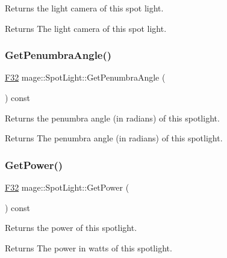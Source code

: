 Returns the light camera of this spot light.

\begin{DoxyReturn}{Returns}
The light camera of this spot light. 
\end{DoxyReturn}
\hypertarget{classmage_1_1_spot_light_a37d61501193f5ed4ecefe4015595ed89}{}\label{classmage_1_1_spot_light_a37d61501193f5ed4ecefe4015595ed89} 
\subsubsection{\texorpdfstring{Get\+Penumbra\+Angle()}{GetPenumbraAngle()}}
{\footnotesize\ttfamily \hyperlink{namespacemage_aa97e833b45f06d60a0a9c4fc22ae02c0}{F32} mage\+::\+Spot\+Light\+::\+Get\+Penumbra\+Angle (\begin{DoxyParamCaption}{ }\end{DoxyParamCaption}) const\hspace{0.3cm}{\ttfamily [noexcept]}}

Returns the penumbra angle (in radians) of this spotlight.

\begin{DoxyReturn}{Returns}
The penumbra angle (in radians) of this spotlight. 
\end{DoxyReturn}
\hypertarget{classmage_1_1_spot_light_afcfb600550f5ca9292e79e5bedb9fad7}{}\label{classmage_1_1_spot_light_afcfb600550f5ca9292e79e5bedb9fad7} 
\subsubsection{\texorpdfstring{Get\+Power()}{GetPower()}}
{\footnotesize\ttfamily \hyperlink{namespacemage_aa97e833b45f06d60a0a9c4fc22ae02c0}{F32} mage\+::\+Spot\+Light\+::\+Get\+Power (\begin{DoxyParamCaption}{ }\end{DoxyParamCaption}) const\hspace{0.3cm}{\ttfamily [noexcept]}}

Returns the power of this spotlight.

\begin{DoxyReturn}{Returns}
The power in watts of this spotlight. 
\end{DoxyReturn}
\hypertarget{classmage_1_1_spot_light_a2c9926f4332198ef4183f7958e9a5644}{}\label{classmage_1_1_spot_light_a2c9926f4332198ef4183f7958e9a5644} 
